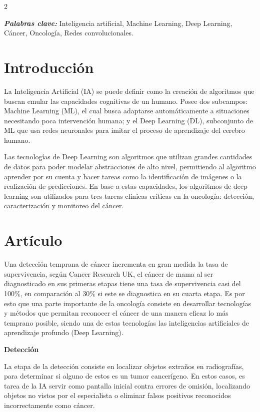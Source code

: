 \documentclass[12pt,spanish,Letterpaper,openany]{book}
\begin{document}
\begin {multicols}{2}

\textbf{\emph{Palabras clave:}} Inteligencia artificial, Machine Learning, Deep Learning, Cáncer, Oncología, Redes convolucionales.

\hypertarget{introducciuxf3n}{%
\section{Introducción}\label{introducciuxf3n}}

La Inteligencia Artificial (IA) se puede definir como la creación de algoritmos que buscan emular las capacidades cognitivas de un humano. Posee dos subcampos: Machine Learning (ML), el cual busca adaptarse automáticamente a situaciones necesitando poca intervención humana; y el Deep Learning (DL), subconjunto de ML que usa redes neuronales para imitar el proceso de aprendizaje del cerebro humano.

Las tecnologías de Deep Learning son algoritmos que utilizan grandes cantidades de datos para poder modelar abstracciones de alto nivel, permitiendo al algoritmo aprender por su cuenta y hacer tareas como la identificación de imágenes o la realización de predicciones. En base a estas capacidades, los algoritmos de deep learning son utilizados para tres tareas clínicas críticas en la oncología: detección, caracterización y monitoreo del cáncer.

\hypertarget{artuxedculo}{%
\section{Artículo}\label{artuxedculo}}

Una detección temprana de cáncer incrementa en gran medida la tasa de supervivencia, según Cancer Research UK, el cáncer de mama al ser diagnosticado en sus primeras etapas tiene una tasa de supervivencia casi del 100\%, en comparación al 30\% si este se diagnostica en su cuarta etapa. Es por esto que una parte importante de la oncología consiste en desarrollar tecnologías y métodos que permitan reconocer el cáncer de una manera eficaz lo más temprano posible, siendo una de estas tecnologías las inteligencias artificiales de aprendizaje profundo (Deep Learning).

\bigskip
\bigskip
\bigskip
\bigskip
\bigskip
\bigskip

\textbf{Detección}

La etapa de la detección consiste en localizar objetos extraños en radiografías, para determinar si alguno de estos es un tumor cancerígeno. En estos casos, es tarea de la IA servir como pantalla inicial contra errores de omisión, localizando objetos no vistos por el especialista o eliminar falsos positivos reconocidos incorrectamente como cáncer.


\end{multicols}
\end{document}
